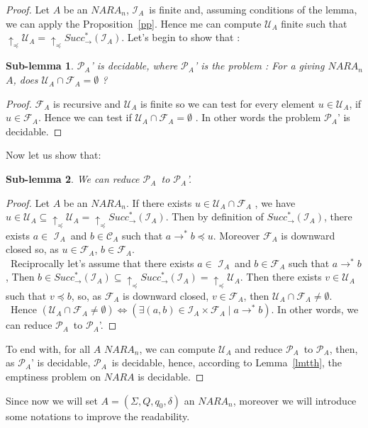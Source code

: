 \documentclass[a4paper,10pt]{report}
\newtheorem{slm}{Sub-lemma}[lm]
\newcommand{\C}{\mathcal{C}_{A}}
\newcommand{\I}{\mathcal{I}_{A}}
\newcommand{\F}{\mathcal{F}_{A}}
\newcommand{\U}{\mathcal{U}_{A}}
\newcommand{\pb}{$\mathcal{P}_{A}$}
\begin{document}
\begin{proof} 
  Let $A$ be an $NARA_n$,
  $\I$\ is finite and, assuming conditions of the lemma, we can apply the Proposition~\ref{pp}.
  Hence me can compute $\U$ finite such that $\uparrow_\preceq \U=\uparrow_\preceq Succ^*_\rightarrow (\I)$.
  Let's begin to show that :
  \begin{slm}	
    \pb' is decidable, where \pb' is the problem : For a giving $NARA_n$ $A$, does $\U \cap \F =\emptyset$ ? 
  \end{slm}
  \begin{proof}
  $\F$ is recursive and $\U$ is finite so we can test for every element $u \in \U$, if $u \in\F$. Hence we can test if $\U \cap\F=\emptyset$ . 
  In other words the problem \pb' is decidable.
  \end{proof}
  Now let us show that:
  \begin{slm}	
    We can reduce \pb\ to \pb'.
  \end{slm}
  \begin{proof}
  Let $A$ be an $NARA_n$.
  If there exists $u \in \U \cap \F$ , we have $u\in \U \subseteq \uparrow_\preceq  \U =\uparrow_\preceq Succ^*_\rightarrow (\I)$. 
  Then by definition of $Succ^*_\rightarrow (\I)$, there exists $a\in$ $\I$\ and $b \in\C$ such that $a \rightarrow^* b \preceq u$.
  Moreover $\F$ is downward closed so, as $u \in \F$,  $b \in \F$.\\\
  Reciprocally let's assume that there exists $a\in$ $\I$\ and $b \in\F$ such that $a \rightarrow^* b $,
  Then $b \in  Succ^*_\rightarrow (\I) \subseteq \uparrow_\preceq Succ^*_\rightarrow (\I)=\uparrow_\preceq  \U$. 
  Then there exists $v \in \U$ such that $v \preceq b$, so, as $\F$ is downward closed, $v \in \F$, then $\U \cap \F \neq \emptyset$.\\\
  Hence $(\U \cap \F \neq \emptyset) \Leftrightarrow (\exists (a,b)\in \I \times \F \mid a \rightarrow^* b )$.
  In other words, we can reduce \pb\ to \pb'.  
  \end{proof}
  To end with, for all $A$  $NARA_n$, we can compute $\U$ and reduce \pb\ to \pb, then, as \pb' is decidable, \pb\ is decidable, hence, according to Lemma~\ref{lmtth}, the emptiness problem on $NARA$ is decidable.
\end{proof}

Since now we will set $A =(\Sigma ,Q ,q_0, \delta )$ an $NARA_n$, moreover we will introduce some notations to improve the readability.
\end{document}
